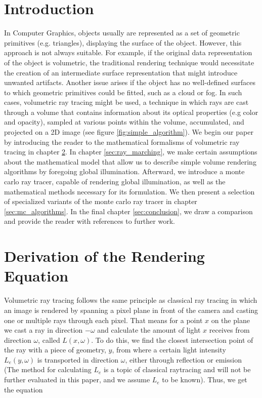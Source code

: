 




\section{Introduction}
In Computer Graphics, objects usually are represented as a set of geometric primitives \cite{KOBBELT2004801} (e.g. triangles), displaying the surface of the object. However, this approach is not always suitable. For example, if the original data representation of the object is volumetric, the traditional rendering technique would necessitate the creation of an intermediate surface representation that might introduce unwanted artifacts\cite{511}. Another issue arises if the object has no well-defined surfaces to which geometric primitives could be fitted, such as a cloud or fog\cite{10.1145/964965.808594}. In such cases, volumetric ray tracing might be used, a technique in which rays are cast through a volume that contains information about its optical properties (e.g color and opacity), sampled at various points within the volume, accumulated, and projected on a 2D image (see figure \ref{fig:simple_algorithm})\cite{511}.
We begin our paper by introducing the reader to the mathematical formalisms of volumetric ray tracing in chapter \ref{sec:math}. In chapter \ref{sec:ray_marching}, we make certain assumptions about the mathematical model that allow us to describe simple volume rendering algorithms by foregoing global illumination. Afterward, we introduce a monte carlo ray tracer, capable of rendering global illumination, as well as the mathematical methods necessary for its formulation. We then present a selection of specialized variants of the monte carlo ray tracer in chapter \ref{sec:mc_algorithms}. In the final chapter \ref{sec:conclusion}, we draw a comparison and provide the reader with references to further work. 




\section{Derivation of the Rendering Equation}
\label{sec:math}
Volumetric ray tracing follows the same principle as classical ray tracing in which an image is rendered by spanning a pixel plane in front of the camera and casting one or multiple rays through each pixel\cite{10.5555/94788}.
That means for a point ${x}$ on the plane we cast a ray in direction $-\omega$ and calculate the amount of light ${x}$ receives from direction $\omega$, called $L({x},\omega )$.
To do this, we find the closest intersection point of the ray with a piece of geometry,  ${y}$,  from where a certain light intensity $L_e({y},\omega )$ is transported in direction $\omega$, either through reflection or emission (The method for calculating $L_e$ is a topic of classical raytracing\cite{10.5555/94788} and will not be further evaluated in this paper, and we assume $L_e$ to be known).
Thus, we get the equation 


